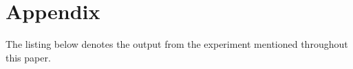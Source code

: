 \section{Appendix}
\label{sec:appendix}

The listing below denotes the output from the experiment mentioned throughout this paper. 
